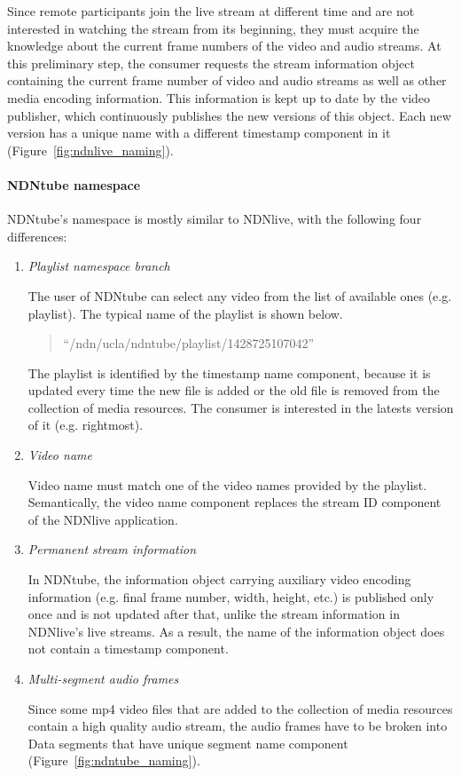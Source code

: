 Since remote participants join the live stream at different time and are not interested in watching the stream from its beginning, they must acquire the knowledge about the current frame numbers of the video and audio streams. At this preliminary step, the consumer requests the stream information object containing the current frame number of video and audio streams as well as other media encoding information. This information is kept up to date by the video publisher, which continuously publishes the new versions of this object. Each new version has a unique name with a different timestamp component in it (Figure~\ref{fig:ndnlive_naming}).


\paragraph{NDNtube namespace} %
\label{par:ndntube_naming}
\vspace{0.3cm}

NDNtube's namespace is mostly similar to NDNlive, with the following four differences:
\begin{enumerate}
	\item{\textit{Playlist namespace branch}} 
		
		The user of NDNtube can select any video from the list of available ones (e.g. playlist). The typical name of the playlist is shown below.
		\begin{quote}
		``/ndn/ucla/ndntube/playlist/1428725107042''
		\end{quote}
    The playlist is identified by the timestamp name component, because it is updated every time the new file is added or the old file is removed from the collection of media resources. The consumer is interested in the latests version of it (e.g. rightmost).
    
	\item{\textit{Video name}} 

		Video name must match one of the video names provided by the playlist. Semantically, the video name component replaces the stream ID component of the NDNlive application.

	\item{\textit{Permanent stream information}} 

    In NDNtube, the information object carrying auxiliary video encoding information (e.g. final frame number, width, height, etc.) is published only once and is not updated after that, unlike the stream information in NDNlive's live streams. As a result, the name of the information object does not contain a timestamp component.

	\item{\textit{Multi-segment audio frames}} 
	
   Since some mp4 video files that are added to the collection of media resources contain a high quality audio stream, the audio frames have to be broken into Data segments that have unique segment name component (Figure~\ref{fig:ndntube_naming}).
\end{enumerate}

